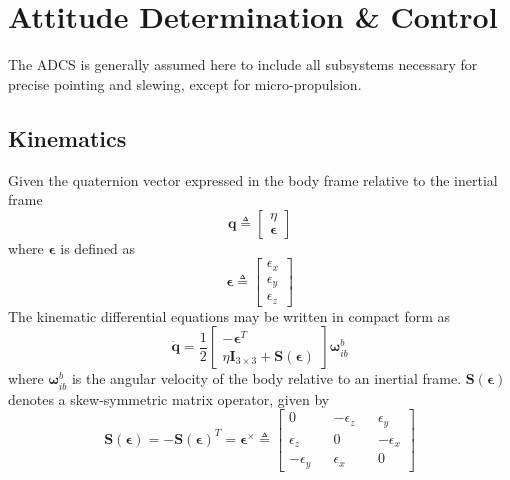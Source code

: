 \section{Attitude Determination \& Control} \label{sec:adcs}
The ADCS is generally assumed here to include all subsystems necessary for precise pointing and slewing, except for micro-propulsion.
\subsection{Kinematics}
Given the quaternion vector expressed in the body frame relative to the inertial frame
\begin{equation}
\mathbf{q}\triangleq 
    \begin{bmatrix}
    \eta \\
    \boldsymbol{\epsilon}
    \end{bmatrix}
\end{equation}
where $\boldsymbol{\epsilon}$ is defined as
\begin{equation}
\boldsymbol{\epsilon}\triangleq 
    \begin{bmatrix}
    \epsilon_x \\
    \epsilon_y \\
    \epsilon_z
    \end{bmatrix}
\end{equation}
The kinematic differential equations may be written in compact form as
\begin{equation}
\dot{\mathbf{q}}=\frac{1}{2}
    \begin{bmatrix}
    -\boldsymbol{\epsilon}^T \\
    \eta\mathbf{I}_{3\times 3}+\mathbf{S}\left ( \boldsymbol{\epsilon} \right)
    \end{bmatrix}\boldsymbol{\omega}_{ib}^b
\end{equation}
\noindent where $\boldsymbol{\omega}_{ib}^b$ is the angular velocity of the body relative to an inertial frame. $\mathbf{S}(\boldsymbol{\epsilon})$ denotes a skew-symmetric matrix operator, given by
\begin{equation}
\mathbf{S}(\boldsymbol{\epsilon})=-\mathbf{S}(\boldsymbol{\epsilon})^{T}=\boldsymbol{\epsilon}^{\times}\triangleq
    \begin{bmatrix}
        0 && -\epsilon_z && \epsilon_y \\
        \epsilon_z && 0 && -\epsilon_x \\
        -\epsilon_y && \epsilon_x && 0 
    \end{bmatrix}
\end{equation}
